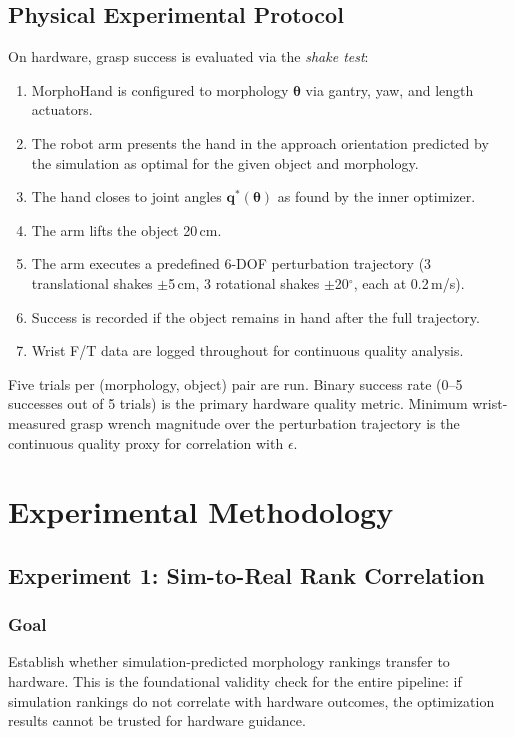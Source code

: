\documentclass[journal]{IEEEtran}
\newcommand{\btheta}{\boldsymbol{\theta}}
\newcommand{\bq}{\mathbf{q}}
\newcommand{\eps}{\epsilon}
\begin{document}
\subsection{Physical Experimental Protocol}

On hardware, grasp success is evaluated via the \emph{shake test}:
\begin{enumerate}
  \item MorphoHand is configured to morphology $\btheta$ via gantry, yaw, and length
    actuators.
  \item The robot arm presents the hand in the approach orientation predicted by the
    simulation as optimal for the given object and morphology.
  \item The hand closes to joint angles $\bq^*(\btheta)$ as found by the inner optimizer.
  \item The arm lifts the object 20\,cm.
  \item The arm executes a predefined 6-DOF perturbation trajectory (3 translational
    shakes $\pm$5\,cm, 3 rotational shakes $\pm$20$^\circ$, each at 0.2\,m/s).
  \item Success is recorded if the object remains in hand after the full trajectory.
  \item Wrist F/T data are logged throughout for continuous quality analysis.
\end{enumerate}
Five trials per (morphology, object) pair are run.
Binary success rate (0--5 successes out of 5 trials) is the primary hardware quality metric.
Minimum wrist-measured grasp wrench magnitude over the perturbation trajectory is the
continuous quality proxy for correlation with $\eps$.

\section{Experimental Methodology}
\label{sec:experiments}

\subsection{Experiment 1: Sim-to-Real Rank Correlation}

\subsubsection{Goal}
Establish whether simulation-predicted morphology rankings transfer to hardware.
This is the foundational validity check for the entire pipeline: if simulation rankings
do not correlate with hardware outcomes, the optimization results cannot be trusted for
hardware guidance.
\end{document}
